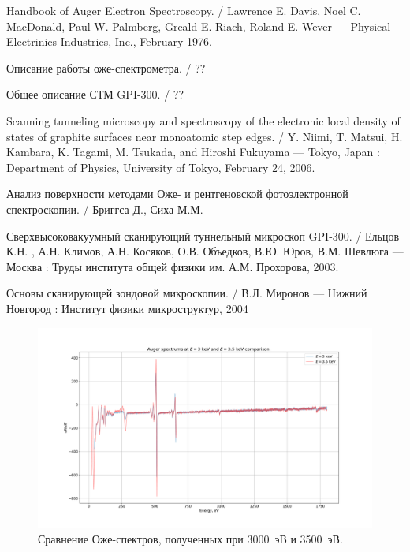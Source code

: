 \documentclass[a4paper, 12pt]{article}
\begin{document}
	\newpage
	
	\begin{thebibliography}{2}
		
		 Handbook of Auger Electron Spectroscopy. /  Lawrence E. Davis, Noel C. MacDonald, Paul W. Palmberg, Greald E. Riach, Roland E. Wever --- Physical Electrinics Industries, Inc., February 1976.
		
		 Описание работы оже-спектрометра. / ??
		
		 Общее описание СТМ GPI-300. / ??
		
		 Scanning tunneling microscopy and spectroscopy of the electronic local density of states of graphite surfaces near monoatomic step edges. / Y. Niimi, T. Matsui, H. Kambara, K. Tagami, M. Tsukada, and Hiroshi Fukuyama --- Tokyo, Japan : Department of Physics, University of Tokyo, February 24, 2006.
		
		 Анализ поверхности методами Оже- и рентгеновской фотоэлектронной спектроскопии. / Бриггса Д., Сиха М.М.
		
		 Сверхвысоковакуумный сканирующий туннельный микроскоп GPI-300. / Ельцов К.Н. , А.Н. Климов, А.Н. Косяков, О.В. Объедков, В.Ю. Юров, В.М. Шевлюга --- Москва : Труды института общей физики им. А.М. Прохорова, 2003.
		
		 Основы сканирующей зондовой микроскопии. / В.Л. Миронов --- Нижний Новгород : Институт физики микроструктур, 2004
		
	\end{thebibliography}
	
	
	\newpage
	
	
	\begin{figure}[H]
		\centering
		\includegraphics[width=1.3\linewidth, angle=-90]{1_Auge_double}
		\caption{Сравнение Оже-спектров, полученных при 3000~эВ и 3500~эВ.}
		\label{fig:1_Auge_double}
	\end{figure}
	
\end{document}
